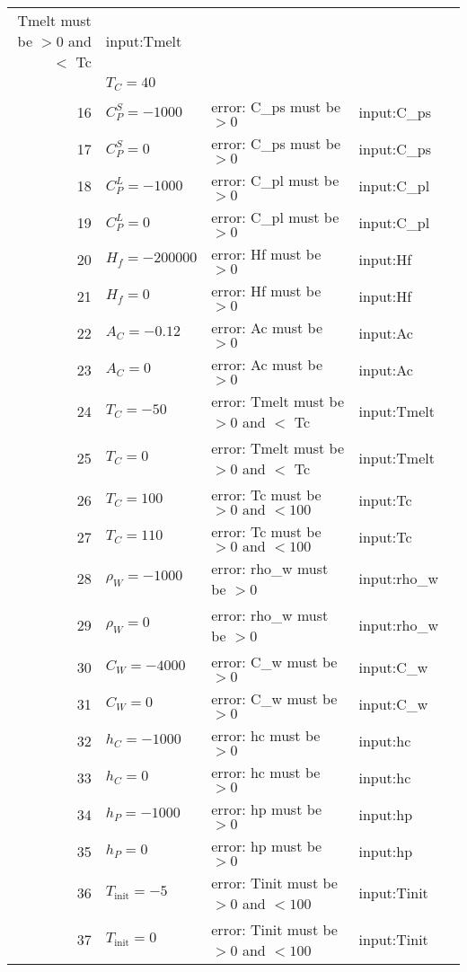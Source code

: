 \documentclass[12pt]{article}
\begin{document}
\begin{center}
\begin{longtable}{ | r | p{4cm} | p{4cm} | p{4cm} | p{4cm} |}
{{	Tmelt must be $> 0$ and $<$ Tc}} & input:Tmelt \\
	& $T_C = 40$ & & \\ \hline
	16 & $C^S_P = -1000$ & error: C\_ps must be $> 0$ &input:C\_{ps} \\ \hline
	17 & $C^S_P = 0$ & error: C\_ps must be $> 0$ &input:C\_{ps} \\ \hline
	18 & $C^L_P = -1000$ & error: C\_pl must be $> 0$ &input:C\_{pl} \\ \hline
	19 & $C^L_P = 0$ & error: C\_pl must be $> 0$ &input:C\_{pl} \\ \hline
	20 & $H_f = -200000$& error: Hf must be $> 0$ & input:Hf \\ \hline
	21 & $H_f = 0$ & error: Hf must be $> 0$ & input:Hf \\ \hline
	22 & $A_C = -0.12$ & error: Ac must be $> 0$ &input:Ac \\ \hline
	23 & $A_C = 0$ & error: Ac must be $> 0$ &input:Ac \\ \hline
	24 & $T_C = -50$ & error: Tmelt must
	 be $> 0$ and $<$ Tc &input:Tmelt \\ \hline
	25 & $T_C = 0$ & error: Tmelt must
	 be $> 0$ and $<$ Tc &input:Tmelt \\ \hline
	26 & $T_C = 100$ & error: Tc must be $> 0 \text{ and } < 100$ &input:Tc \\ \hline
	27 & $T_C = 110$ & error: Tc must be $> 0 \text{ and } < 100$ &input:Tc \\ \hline
	28 & $\rho_W = -1000$ & error: rho\_w must be $> 0$ &input:rho\_{w} \\ \hline
	29 & $\rho_W = 0$ & error: rho\_w must be $> 0$ &input:rho\_{w} \\ \hline
	30 & $C_W = -4000$ & error: C\_w must be $> 0$ &input:C\_{w} \\ \hline
	31 & $C_W = 0$ & error: C\_w must be $> 0$ &input:C\_{w} \\ \hline
	32 & $h_C = -1000$ & error: hc must be $> 0$ &input:hc \\ \hline
	33 & $h_C = 0$ & error: hc must be $> 0$ &input:hc \\ \hline
	34 & $h_P = -1000$ & error: hp must be $> 0$ &input:hp \\ \hline
	35 & $h_P = 0$ & error: hp must be $> 0$ &input:hp \\ \hline
	36 & $T_{\text{init}} = -5$ & error: Tinit must be $> 0$ and $< 100$ &input:Tinit \\ \hline
	37 & $T_{\text{init}} = 0$ & error: Tinit must be $> 0$ and $< 100$ &input:Tinit \\ \hline

\end{longtable}
\end{center}
\end{document}
